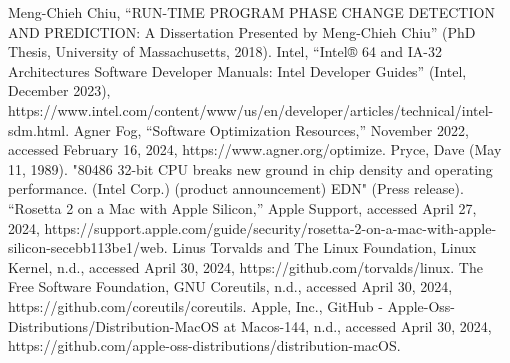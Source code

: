 \documentclass[conference]{IEEEtran}
\begin{document}
\begin{thebibliography}{00}
	 Meng-Chieh Chiu, “RUN-TIME PROGRAM PHASE CHANGE DETECTION AND PREDICTION: A Dissertation Presented by Meng-Chieh Chiu” (PhD Thesis, University of Massachusetts, 2018).
	 Intel, “Intel® 64 and IA-32 Architectures Software Developer Manuals: Intel Developer Guides” (Intel, December 2023), https://www.intel.com/content/www/us/en/developer/articles/technical/intel-sdm.html.
	 Agner Fog, “Software Optimization Resources,” November 2022, accessed February 16, 2024, https://www.agner.org/optimize.
	 Pryce, Dave (May 11, 1989). "80486 32-bit CPU breaks new ground in chip density and operating performance. (Intel Corp.) (product announcement) EDN" (Press release).
	 “Rosetta 2 on a Mac with Apple Silicon,” Apple Support, accessed April 27, 2024, https://support.apple.com/guide/security/rosetta-2-on-a-mac-with-apple-silicon-secebb113be1/web.
	 Linus Torvalds and The Linux Foundation, Linux Kernel, n.d., accessed April 30, 2024, https://github.com/torvalds/linux.
	 The Free Software Foundation, GNU Coreutils, n.d., accessed April 30, 2024, https://github.com/coreutils/coreutils.
	 Apple, Inc., GitHub - Apple-Oss-Distributions/Distribution-MacOS at Macos-144, n.d., accessed April 30, 2024, https://github.com/apple-oss-distributions/distribution-macOS.
\end{thebibliography}
\end{document}
